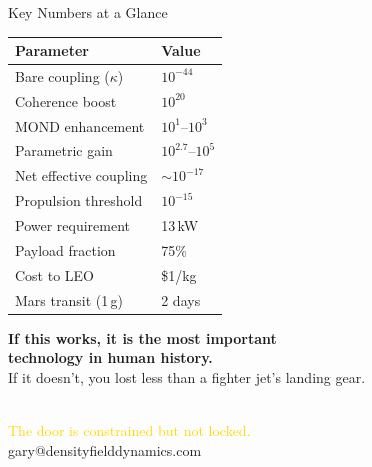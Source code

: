 \documentclass[aspectratio=169,10pt]{beamer}
\begin{document}

\begin{frame}[t]{Key Numbers at a Glance}
\vspace{0.2cm}
\begin{center}
\footnotesize
\begin{tabular}{l l}
  \toprule
  \textbf{Parameter} & \textbf{Value} \\
  \midrule
  Bare coupling ($\kappa$)   & $10^{-44}$ \\
  Coherence boost            & $10^{20}$ \\
  MOND enhancement           & $10^{1}$--$10^{3}$ \\
  Parametric gain            & $10^{2.7}$--$10^{5}$ \\
  Net effective coupling     & $\sim 10^{-17}$ \\
  Propulsion threshold       & $10^{-15}$ \\
  Power requirement          & 13\,kW \\
  Payload fraction           & 75\% \\
  Cost to LEO                & \$1/kg \\
  Mars transit (1\,g)        & 2 days \\
  \bottomrule
\end{tabular}
\end{center}
\end{frame}

\begin{frame}[plain]
\vfill
\begin{center}
  {\large\bfseries If this works, it is the most important}\\[4pt]
  {\large\bfseries technology in human history.}\\[24pt]
  {\normalsize\textcolor{electricblue}{If it doesn't, you lost
    less than a fighter jet's landing gear.}}
\end{center}
\vfill
\end{frame}

\begin{frame}[plain]
\vfill
\begin{center}
\\[20pt]
  {\normalsize\textcolor{gold}{The door is constrained
    but not locked.}}\\[12pt]
  {\small\textcolor{electricblue}{gary@densityfielddynamics.com}}
\end{center}
\vfill
\end{frame}
\end{document}
